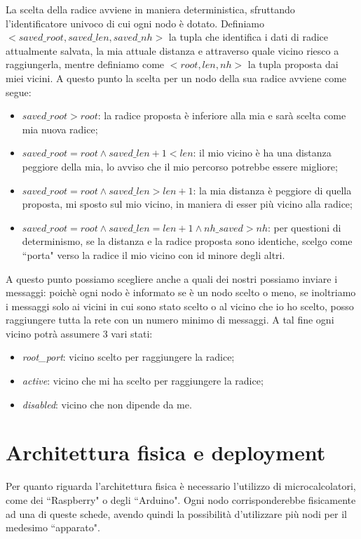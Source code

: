 \documentclass[italian]{memoir}
\begin{document}
La scelta della radice avviene in maniera deterministica, sfruttando l'identificatore univoco di cui ogni nodo è dotato. Definiamo $<saved\_root, saved\_len, saved\_nh>$ la tupla che identifica i dati di radice attualmente salvata, la mia attuale distanza e attraverso quale vicino riesco a raggiungerla, mentre definiamo come $<root, len, nh>$ la tupla proposta dai miei vicini. A questo punto la scelta per un nodo della sua radice avviene come segue:
\begin{itemize}
    \item $saved\_root > root$: la radice proposta è inferiore alla mia e sarà scelta come mia nuova radice;
    \item $saved\_root = root \land saved\_len + 1 < len$: il mio vicino è ha una distanza peggiore della mia, lo avviso che il mio percorso potrebbe essere migliore;
    \item $saved\_root = root \land saved\_len > len + 1 $: la mia distanza è peggiore di quella proposta, mi sposto sul mio vicino, in maniera di esser più vicino alla radice;
    \item $saved\_root = root \land saved\_len = len + 1  \land nh\_saved > nh$: per questioni di determinismo, se la distanza e la radice proposta sono identiche, scelgo come ``porta" verso la radice il mio vicino con id minore degli altri.
\end{itemize}

A questo punto possiamo scegliere anche a quali dei nostri possiamo inviare i messaggi: poichè ogni nodo è informato se è un nodo scelto o meno, se inoltriamo i messaggi solo ai vicini in cui sono stato scelto o al vicino che io ho scelto, posso raggiungere tutta la rete con un numero minimo di messaggi. A tal fine ogni vicino potrà assumere 3 vari stati:
\begin{itemize}
    \item\textit{root\_port}: vicino scelto per raggiungere la radice;
    \item\textit{active}: vicino che mi ha scelto per raggiungere la radice;
    \item\textit{disabled}: vicino che non dipende da me.
\end{itemize}


\section{Architettura fisica e deployment}
Per quanto riguarda l'architettura fisica è necessario l'utilizzo di microcalcolatori,
	   come dei ``Raspberry" o degli ``Arduino". Ogni nodo corrisponderebbe fisicamente
	   ad una di queste schede, avendo quindi la possibilità d'utilizzare più nodi
	   per
	   il medesimo ``apparato".
\end{document}
